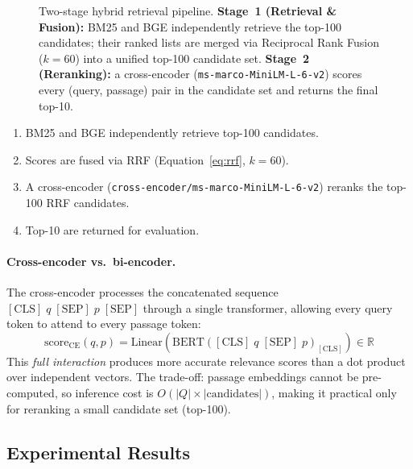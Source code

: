 \documentclass[12pt, a4paper]{article}
\begin{document}
\begin{figure}[h]
\caption{Two-stage hybrid retrieval pipeline.
  \textbf{Stage~1 (Retrieval \& Fusion):} BM25 and BGE independently retrieve
  the top-100 candidates; their ranked lists are merged via Reciprocal Rank
  Fusion ($k=60$) into a unified top-100 candidate set.
  \textbf{Stage~2 (Reranking):} a cross-encoder
  (\texttt{ms-marco-MiniLM-L-6-v2}) scores every (query, passage) pair in
  the candidate set and returns the final top-10.}
\label{fig:pipeline}
\end{figure}

\begin{enumerate}
  \item BM25 and BGE independently retrieve top-100 candidates.
  \item Scores are fused via RRF (Equation~\ref{eq:rrf}, $k=60$).
  \item A cross-encoder (\texttt{cross-encoder/ms-marco-MiniLM-L-6-v2})
        reranks the top-100 RRF candidates.
  \item Top-10 are returned for evaluation.
\end{enumerate}

\paragraph{Cross-encoder vs.\ bi-encoder.}
The cross-encoder processes the concatenated sequence
$[\text{CLS}]\; q\; [\text{SEP}]\; p\; [\text{SEP}]$ through a single
transformer, allowing every query token to attend to every passage token:
\begin{equation}
  \text{score}_{\text{CE}}(q, p)
    = \text{Linear}\!\left(\text{BERT}([\text{CLS}]\; q\; [\text{SEP}]\; p)_{[\text{CLS}]}\right)
    \in \mathbb{R}
  \label{eq:cross_encoder}
\end{equation}
This \emph{full interaction} produces more accurate relevance scores than a
dot product over independent vectors.  The trade-off: passage embeddings
cannot be pre-computed, so inference cost is $O(|Q| \times |\text{candidates}|)$,
making it practical only for reranking a small candidate set (top-100).

\subsection{Experimental Results}
\end{document}
